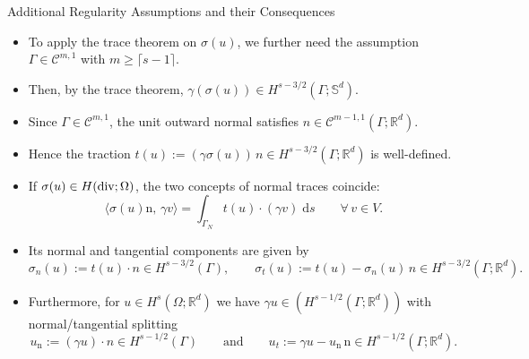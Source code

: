 \documentclass[10pt,aspectratio=169]{beamer}
\def\R{{\mathbb R}}
\def\cC{{\mathcal C}}
\def\d{{\mathrm{d}}}
\def\ds{{\d s}}
\newcommand{\diver}{\operatornamewithlimits{div}}
\begin{document}
\begin{frame}{Additional Regularity Assumptions and their Consequences}
	\begin{itemize}
		\item To apply the trace theorem on $\sigma(u)$, we further need the assumption $\Gamma\in \cC^{m,1}$ with $m\ge \lceil s-1\rceil$.
		\item Then, by the trace theorem, $\gamma(\sigma(u))\in H^{s-3/2}(\Gamma;\mathbb S^d)$.
		\item Since $\Gamma\in \mathcal C^{m,1}$, the unit outward normal satisfies $n\in \mathcal C^{m-1,1}(\Gamma;\R^d)$.
		\item Hence the traction $t(u):=(\gamma \sigma(u))\,n\in H^{s-3/2}(\Gamma;\R^d)$ is well-defined.
		\item If $\sigma(u)\in H(\diver;\Omega)$, the two concepts of normal traces coincide:
		      \begin{equation*}
			      \langle \sigma(u)\mathrm{n},\, \gamma v\rangle  = \int_{\Gamma_N}t(u)\cdot (\gamma v)\;\ds\qquad \forall\, v\in V.
		      \end{equation*}
		\item Its normal and tangential components are given by
		      \begin{equation*}
			      \sigma_n(u):=t(u)\cdot n\in H^{s-3/2}(\Gamma),
			      \qquad
			      \sigma_t(u):=t(u)-\sigma_n(u)\,n\in H^{s-3/2}(\Gamma;\R^d).
		      \end{equation*}
		\item Furthermore, for $u\in H^{s}(\Omega;\R^d)$ we have $\gamma u\in (H^{s-1/2}(\Gamma;\R^d))$ with normal/tangential splitting
		      \begin{equation*}
			      u_\mathrm{n}:= (\gamma u)\cdot n\in H^{s-1/2}(\Gamma)\qquad\text{and}\qquad u_t:= \gamma u- u_\mathrm{n}\,\mathrm{n}\in H^{s-1/2}(\Gamma;\R^d).
		      \end{equation*}
	\end{itemize}
\end{frame}
\end{document}
